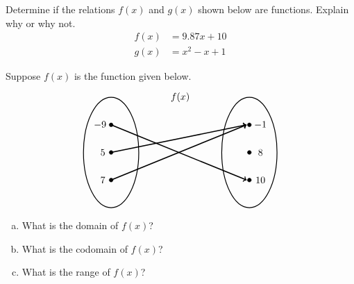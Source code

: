 \documentclass[11pt,letterpaper]{article}
\begin{document}
\prob Determine if the relations $f(x)$ and $g(x)$ shown below are functions. Explain why or why not. 
	\[
	\begin{aligned}
	f(x)&= 9.87x + 10 \\[0.3cm]
	g(x)&= x^2 - x + 1
	\end{aligned}
	\] \pspace


\prob Suppose $f(x)$ is the function given below.
	\[
	\begin{tikzpicture}
	\node at (2.5,2) {$f(x)$};
	\draw[line width=0.03cm] (0,0) circle (1 and 2);
	\draw[line width=0.03cm] (5,0) circle (1 and 2);
	
	\draw[fill=black] (0,1) circle (0.07);
	\draw[fill=black] (0,0) circle (0.07);
	\draw[fill=black] (0,-1) circle (0.07);
	
	\draw[fill=black] (5,1) circle (0.07);
	\draw[fill=black] (5,0) circle (0.07);
	\draw[fill=black] (5,-1) circle (0.07);
	
	\draw[line width=0.04cm,->] (0,1) -- (4.9,-1);
	\draw[line width=0.04cm,->] (0,0) -- (4.9,1);
	\draw[line width=0.04cm,->] (0,-1) -- (4.9,1);
	
	\node at (-0.4,1) {$-9$};
	\node at (-0.3,0) {$5$};
	\node at (-0.3,-1) {$7$};
	
	\node at (5.4,1) {$-1$};
	\node at (5.4,0) {$8$};
	\node at (5.4,-1) {$10$};
	\end{tikzpicture}
	\]

\begin{enumerate}[(a)]
\item What is the domain of $f(x)$?
\item What is the codomain of $f(x)$?
\item What is the range of $f(x)$?
\end{enumerate} \pspace
\end{document}
